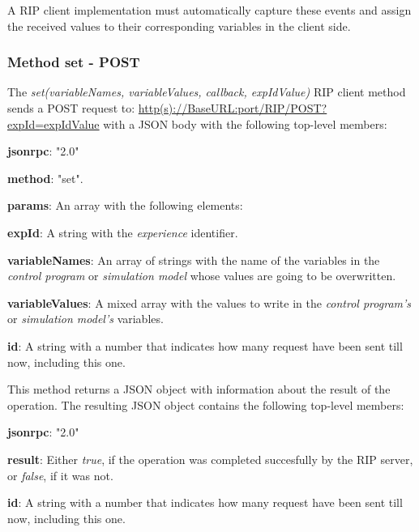 A RIP client implementation must automatically capture these events and assign the received values to their corresponding variables in the client side.

\subsubsection{Method set - POST}
\label{sec:set}
The \textit{set(variableNames, variableValues, callback, expIdValue)} RIP client method sends a POST request to: \url{http(s)://BaseURL:port/RIP/POST?expId=expIdValue} with a JSON body with the following top-level members:

\begin{myEnumerate}
    \item \textbf{jsonrpc}: "2.0"
    \item \textbf{method}: "set".
    \item \textbf{params}: An array with the following elements:
    \begin{myEnumerate}
        \item \textbf{expId}: A string with the \textit{experience} identifier.
        \item \textbf{variableNames}: An array of strings with the name of the variables in the \textit{control program} or \textit{simulation model} whose values are going to be overwritten.
        \item \textbf{variableValues}: A mixed array with the values to write in the \textit{control program's} or \textit{simulation model's} variables.
    \end{myEnumerate}
    \item \textbf{id}: A string with a number that indicates how many request have been sent till now, including this one.
\end{myEnumerate}

This method returns a JSON object with information about the result of the operation. The resulting JSON object contains the following top-level members:

\begin{myEnumerate}
    \item \textbf{jsonrpc}: "2.0"
    \item \textbf{result}: Either \textit{true}, if the operation was completed succesfully by the RIP server, or \textit{false}, if it was not.
    \item \textbf{id}: A string with a number that indicates how many request have been sent till now, including this one.
\end{myEnumerate}

